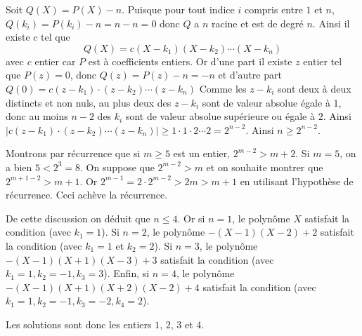 \begin{sol}
Soit $Q(X) = P(X) - n$. Puisque pour tout indice $i$ compris entre $1$ et $n$, $Q(k_i) = P(k_i) - n = n - n = 0$ donc $Q$ a $n$ racine et est de degré $n$. Ainsi il existe $c$ tel que
$$Q(X) = c(X - k_1)(X - k_2)\cdots (X - k_n)$$ avec $c$ entier car $P$ est à coefficients entiers.
Or d'une part il existe $z$ entier tel que $P(z) = 0$, donc $Q(z) = P(z) - n =  - n$ et d'autre part $Q(0) = c(z - k_1)\cdot(z - k_2)\cdots (z - k_n)$
Comme les $z - k_i$ sont deux à deux distincts et non nuls, au plus deux des $z - k_i$ sont de valeur absolue égale à $1$, donc au moins $n - 2$ des $k_i$ sont de valeur absolue supérieure ou égale à $2$. Ainsi $\mid c(z - k_1)\cdot(z - k_2)\cdots (z - k_n)\mid \ge 1\cdot 1\cdot 2\cdots 2 = 2^{n - 2}$. Ainsi $n\ge 2^{n - 2}$.

Montrons par récurrence que si $m\ge 5$ est un entier, $2^{m - 2}>m + 2$. Si $m = 5$, on a bien $5<2^3 = 8$. On suppose que $2^{m - 2}>m$ et on souhaite montrer que $2^{m + 1 - 2}>m + 1$.
Or $2^{m - 1} = 2\cdot 2^{m - 2}>2m>m + 1$ en utilisant l'hypothèse de récurrence. Ceci achève la récurrence.

De cette discussion on déduit que $n\le 4$.
Or si $n = 1$, le polynôme $X$ satisfait la condition (avec $k_1 = 1$). Si $n = 2$, le polynôme $-(X - 1)(X - 2) + 2$ satisfait la condition (avec $k_1 = 1$ et $k_2 = 2$). Si $n = 3$, le polynôme $-(X - 1)(X + 1)(X - 3) + 3$ satisfait la condition (avec $k_1 = 1, k_2 = -1, k_3 = 3$). Enfin, si $n = 4$, le polynôme $-(X - 1)(X + 1)(X + 2)(X - 2) + 4$ satisfait la condition (avec $k_1 = 1, k_2 = -1,k_3 = -2,k_4 = 2$).

Les solutions sont donc les entiers $1$, $2$, $3$ et $4$.
\end{sol}
